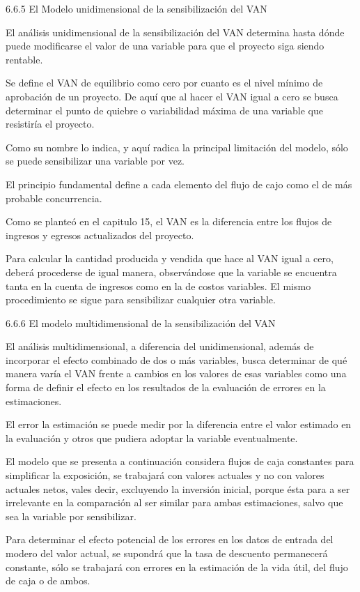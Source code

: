 6.6.5   El Modelo unidimensional de la sensibilización del VAN

El análisis unidimensional de la sensibilización del VAN determina hasta dónde puede modificarse el valor de una variable para que el proyecto siga siendo rentable.

Se define el VAN de equilibrio como cero por cuanto es el nivel mínimo de aprobación de un proyecto. De aquí que al hacer el VAN igual a cero se busca determinar el punto de quiebre o variabilidad máxima de una variable que resistiría el proyecto.

Como su nombre lo indica, y aquí radica la principal limitación del modelo, sólo se puede sensibilizar una variable por vez.

El principio fundamental define a cada elemento del flujo de cajo como el de más probable concurrencia.

Como se planteó en el capitulo 15, el VAN es la diferencia entre los flujos de ingresos y egresos actualizados del proyecto.

Para calcular la cantidad producida y vendida que hace al VAN igual a cero, deberá procederse de igual manera, observándose que la variable se encuentra tanta en la cuenta de ingresos como en la de costos variables. El mismo procedimiento se sigue para sensibilizar cualquier otra variable.

6.6.6   El modelo multidimensional de la sensibilización del VAN

El análisis multidimensional, a diferencia del unidimensional, además de incorporar el efecto combinado de dos o más variables, busca determinar de qué manera varía el VAN frente a cambios en los valores de esas variables como una forma de definir el efecto en los resultados de la evaluación de errores en la estimaciones.

El error la estimación se puede medir por la diferencia entre el valor estimado en la evaluación y otros que pudiera adoptar la variable eventualmente.

El modelo que se presenta a continuación considera flujos de caja constantes para simplificar la exposición, se trabajará con valores actuales y no con valores actuales netos, vales decir, excluyendo la inversión inicial, porque ésta para a ser irrelevante en la comparación al ser similar para ambas estimaciones, salvo que sea la variable por sensibilizar.

Para determinar el efecto potencial de los errores en los datos de entrada del modero del valor actual, se supondrá que la tasa de descuento permanecerá constante, sólo se trabajará con errores en la estimación de la vida útil, del flujo de caja o de ambos.

